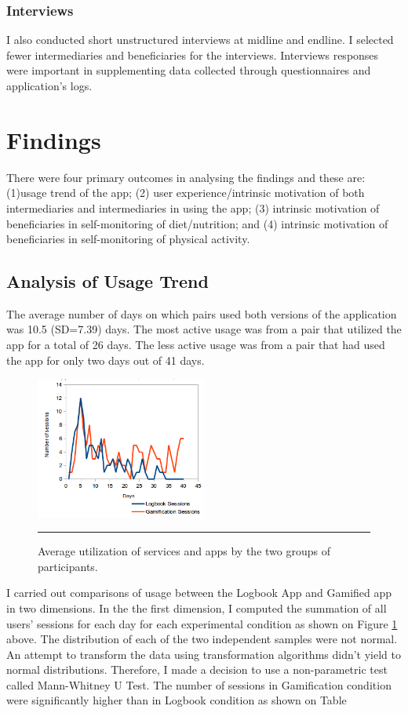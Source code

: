 \subsubsection{Interviews}
I also conducted short unstructured interviews at midline and endline. I selected fewer intermediaries and beneficiaries for the interviews. Interviews responses were important in supplementing data collected through questionnaires and application's logs.
\section{Findings}
There were four primary outcomes in analysing the findings and these are: (1)usage trend of the app; (2) user experience/intrinsic motivation  of both intermediaries and intermediaries in using the app; (3) intrinsic motivation of beneficiaries in self-monitoring of diet/nutrition; and (4) intrinsic motivation of beneficiaries in self-monitoring of physical activity.
\subsection{Analysis of Usage Trend}
The average number of days on which pairs used both versions of the application was 10.5 (SD=7.39) days. The most active usage was from a pair that utilized the app for a total of 26 days. The less active usage was from a pair that had used the app for only two days out of 41 days.
\begin{figure}[htbp]
  \centering
    \includegraphics[width=0.5\textwidth]{Figures/scatter_daily_sessions.png}
    \rule{35em}{0.5pt}
  \caption{Average utilization of services and apps by the two groups of participants.}
  \label{figure:usagedailysessions}
\end{figure}\newline
I carried out comparisons of usage between the Logbook App and Gamified app in two dimensions. In the the first dimension, I computed the summation of all users' sessions for each day for each experimental condition as shown on Figure \ref{figure:usagedailysessions} above. The distribution of each of the two independent samples were not normal. An attempt to transform the data using transformation algorithms didn't yield to normal distributions. Therefore, I made a decision to use a non-parametric test called Mann-Whitney U Test. The number of sessions in Gamification condition were significantly higher than in Logbook condition as shown on Table

